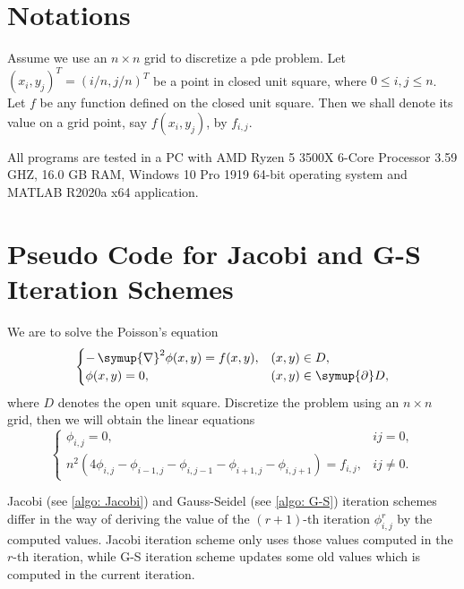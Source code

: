 \documentclass{assignment}[2019/10/15]
\begin{document}
    \section{Notations}

    Assume we use an $n\times n$ grid to discretize a pde problem. Let $(x_i, y_j)^T = (i/n, j/n)^T$ be a point in closed unit square, where $0\leq i, j\leq n$. Let $f$ be any function defined on the closed unit square. Then we shall denote its value on a grid point, say $f(x_i, y_j)$, by $f_{i, j}$.

    All programs are tested in a PC with AMD Ryzen 5 3500X 6-Core Processor 3.59 GHZ, 16.0 GB RAM, Windows 10 Pro 1919 64-bit operating system and MATLAB R2020a x64 application.

    \section{Pseudo Code for Jacobi and G-S Iteration Schemes}

    We are to solve the Poisson's equation
    \begin{equation}
        \begin{cases}
            -\mathop{}\!\symup{\nabla}^2 \phi(x, y) = f(x, y), & (x, y)\in D,\\
            \phi(x, y) = 0, &(x, y)\in \mathop{}\!\symup{\partial} D,
        \end{cases}
    \end{equation}
    where $D$ denotes the open unit square. Discretize the problem using an $n\times n$ grid, then we will obtain the linear equations
    \begin{equation}
        \begin{cases}
            \phi_{i, j} = 0, &ij=0,\\
            n^2\left(4\phi_{i, j}-\phi_{i-1, j}-\phi_{i, j-1}-\phi_{i+1,j}-\phi_{i,j+1}\right)=f_{i, j}, &ij\neq 0.
        \end{cases}
    \end{equation}

    Jacobi (see \ref{algo: Jacobi}) and Gauss-Seidel (see \ref{algo: G-S}) iteration schemes differ in the way of deriving the value of the $(r+1)$-th iteration $\phi_{i, j}^r$ by the computed values. Jacobi iteration scheme only uses those values computed in the $r$-th iteration, while G-S iteration scheme updates some old values which is computed in the current iteration.
\end{document}
